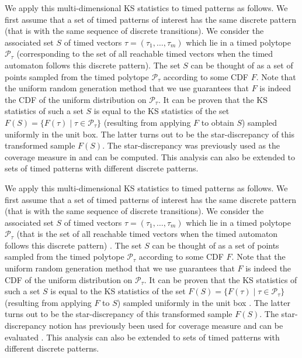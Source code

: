 We apply this multi-dimensional KS statistics to timed patterns as follows. We first assume that a set of timed patterns of interest has the same discrete pattern (that is with the same sequence of discrete transitions). We consider the associated set $S$ of timed vectors $\tau = (\tau_1, \ldots, \tau_m)$ which lie in a timed polytope $\mathcal{P}_{\tau}$ (corresponding to the set of all reachable timed vectors when the timed automaton follows this discrete pattern). The set $S$ can be thought of as a set of points sampled from the timed polytope $\mathcal{P}_{\tau}$ according to some CDF $F$. Note that the uniform random generation method  \cite{BBBK16}  that we use guarantees that $F$ is indeed the CDF of the uniform distribution on $\mathcal{P}_{\tau}$. It can be proven that the KS statistics of such a set $S$ is equal to the KS statistics of the set $F(S)=\{F(\tau)\mid  \tau \in \mathcal{P}_{\tau}\}$ (resulting from applying $F$ to obtain $S$) sampled uniformly in the unit box. The latter turns out to be the star-discrepancy of this transformed sample $F(S)$. The star-discrepancy was previously used as the coverage measure in \cite{Dang10} and can be computed. This analysis can also be extended to sets of timed patterns with different discrete patterns.

We apply this multi-dimensional KS statistics to timed patterns as follows. We first assume that a set of timed patterns of interest has the same discrete pattern (that is with the same sequence of discrete transitions). We consider the associated set $S$ of timed vectors $\tau = (\tau_1, \ldots, \tau_m)$ which lie in a timed polytope $\mathcal{P}_{\tau}$ (that is the set of all reachable timed vectors when the timed automaton follows this discrete pattern) \cite{BBBK16}. The set $S$ can be thought of as a set of points sampled from the timed polytope $\mathcal{P}_{\tau}$ according to some CDF $F$. Note that the uniform random generation method  \cite{BBBK16}  that we use guarantees that $F$ is indeed the CDF of the uniform distribution on $\mathcal{P}_{\tau}$. It can be proven that the KS statistics of such a set $S$ is equal to the KS statistics of the set $F(S)=\{F(\tau)\mid  \tau \in \mathcal{P}_{\tau}\}$ (resulting from applying $F$ to $S$) sampled uniformly in the unit box \cite{rosenblatt1952}. The latter turns out to be the star-discrepancy of this transformed sample $F(S)$. The star-discrepancy notion has previously been used for coverage measure and can be evaluated \cite{DangN09}. This analysis can also be extended to sets of timed patterns with different discrete patterns.

